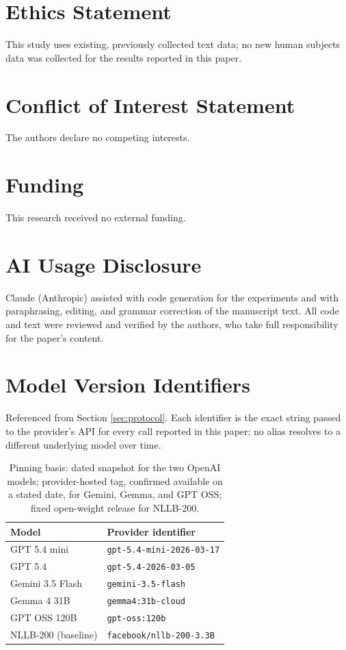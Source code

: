 \documentclass[11pt,a4paper]{article}
\begin{document}
\section*{Ethics Statement}

This study uses existing, previously collected text data; no new human subjects data was collected for the results reported in this paper.

\section*{Conflict of Interest Statement}

The authors declare no competing interests.

\section*{Funding}

This research received no external funding.

\section*{AI Usage Disclosure}

Claude (Anthropic) assisted with code generation for the experiments and with paraphrasing, editing, and grammar correction of the manuscript text. All code and text were reviewed and verified by the authors, who take full responsibility for the paper's content.




\appendix

\section{Model Version Identifiers}
\label{sec:appendix-a}

Referenced from Section \ref{sec:protocol}. Each identifier is the exact string passed to the provider's API for every call reported in this paper; no alias resolves to a different underlying model over time.

\begin{table}[h]
\centering
\small
\begin{tabular}{ll}
\toprule
\textbf{Model} & \textbf{Provider identifier} \\
\midrule
GPT 5.4 mini & \texttt{gpt-5.4-mini-2026-03-17} \\
GPT 5.4 & \texttt{gpt-5.4-2026-03-05} \\
Gemini 3.5 Flash & \texttt{gemini-3.5-flash} \\
Gemma 4 31B & \texttt{gemma4:31b-cloud} \\
GPT OSS 120B & \texttt{gpt-oss:120b} \\
NLLB-200 (baseline) & \texttt{facebook/nllb-200-3.3B} \\
\bottomrule
\end{tabular}
\caption{Pinning basis: dated snapshot for the two OpenAI models; provider-hosted tag, confirmed available on a stated date, for Gemini, Gemma, and GPT OSS; fixed open-weight release for NLLB-200.}
\label{tab:appendix-ids}
\end{table}
\end{document}
